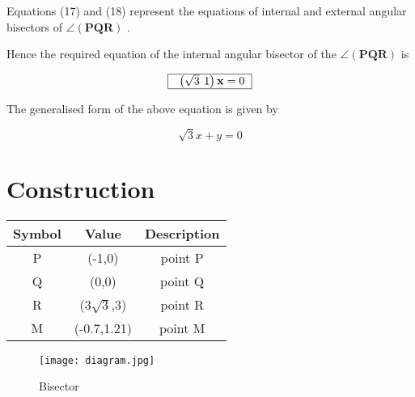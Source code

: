 \documentclass[journal,10pt,twocolumn]{article}
\let\vec\mathbf
\begin{document}
\begin{flushleft}
    Equations (17) and (18) represent the equations of internal and external angular bisectors of  $\angle(\vec{PQR})$ .
    \vspace{0.1cm}
    
    Hence the required equation of the internal angular bisector of the  $\angle(\vec{PQR})$  is
    \end{flushleft}
    
\begin{table}[H]
    \begin{equation}
    \begin{tabular}{|l|c|c|c|c|c|c|c|c}\hline\textbf{ $\begin{pmatrix} \sqrt{3}  \ 1\end{pmatrix}\vec{x} = 0$}\\\hline
    \end{tabular}
    \end{equation}
\end{table}

\begin{flushleft}
    The generalised form of the above equation is given by 
\end{flushleft}
\begin{equation}
     \sqrt{3}x + y = 0 
\end{equation}
    
    
\section{Construction}

\begin{table}[h]
	\centering
\setlength\extrarowheight{2pt}
	\begin{tabular}{|c|c|c|}
		\hline
		\textbf{Symbol} & \textbf{Value} & \textbf{Description} \\
		\hline
		P & (-1,0) & point P\\
		\hline
		Q & (0,0) & point Q\\
		\hline
		R & (3$\sqrt{3}$,3) & point R\\
		\hline
		M & (-0.7,1.21) & point M\\
		\hline
	\end{tabular}
\end{table}

\begin{figure}[H]
    \centering
    \texttt{[image: diagram.jpg]}
    \caption{Bisector}
    \label{fig:Bisector}
\end{figure}
\end{document}
